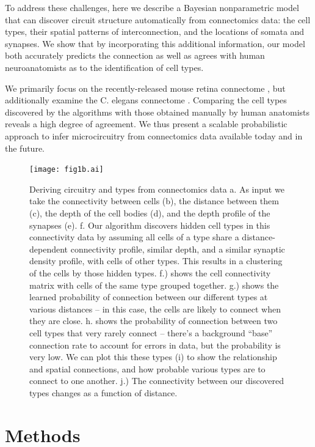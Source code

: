 \documentclass{article}
\begin{document}
To address these challenges, here we describe a Bayesian
nonparametric model that can discover circuit structure automatically
from connectomics data: the cell types, their spatial patterns of
interconnection, and the locations of somata and synapses. We show
that by incorporating this additional information, our model both
accurately predicts the connection as well as agrees
with human neuroanatomists as to the identification of cell types.  

We primarily focus on the recently-released mouse retina connectome
\autocite{Helmstaedter2013}, but additionally examine the C. elegans
connectome \autocite{White1986}. 
Comparing the cell
types discovered by the algorithms with those obtained manually by
human anatomists reveals a high degree of agreement. We thus present a
scalable probabilistic approach to infer microcircuitry from
connectomics data available today and in the future. 

\begin{figure}
  \centering 
  \centerline{\texttt{[image: fig1b.ai]}}
  \caption{Deriving circuitry and types from connectomics data a. As input we take the connectivity between cells (b), the distance between them (c), the depth of the cell bodies (d), and the depth profile of the synapses (e). f. Our algorithm discovers hidden cell types in this
    connectivity data by assuming all cells of a type share a
    distance-dependent connectivity profile, similar depth, and a
    similar synaptic density profile, with cells of other types.  This
    results in a clustering of the cells by those hidden
    types. f.) shows the cell connectivity matrix with cells of the
    same type grouped together. g.) shows the learned probability of
    connection between our different types at various distances -- in
    this case, the cells are likely to connect when they are
    close. h. shows the probability of connection between two cell types
that very rarely connect -- there's a background ``base'' connection rate
to account for errors in data, but the probability is very low. 
We can plot this these types (i) to show the relationship and spatial
connections, and how probable various types are to connect to one
another. j.) The connectivity between our discovered types changes as a
function of distance. }

\label{fig:overview}
\end{figure}

\section*{Methods}
\end{document}
